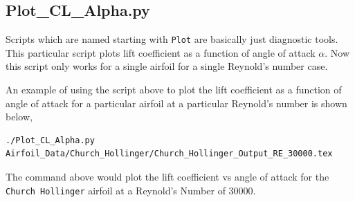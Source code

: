 \subsection{Plot\_CL\_Alpha.py}

Scripts which are named starting with \texttt{Plot} are basically just diagnostic tools. This particular script plots lift coefficient as a function of angle of attack $\alpha$. Now this script only works for a single airfoil for a single Reynold's number case.

$$$$
An example of using the script above to plot the lift coefficient as a function of angle of attack for a particular airfoil at a particular Reynold's number is shown below,
\begin{lstlisting}
./Plot_CL_Alpha.py Airfoil_Data/Church_Hollinger/Church_Hollinger_Output_RE_30000.tex 
\end{lstlisting}
The command above would plot the lift coefficient vs angle of attack for the \texttt{Church Hollinger} airfoil at a Reynold's Number of $30000$.

